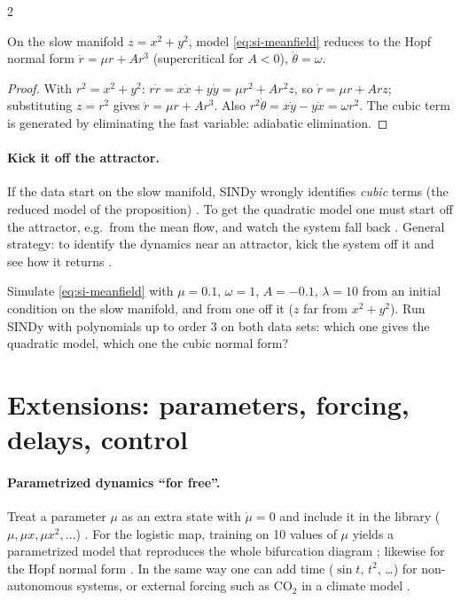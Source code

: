 \begin{paracol}{2}
\begin{proposition}
On the slow manifold $z=x^2+y^2$, model \eqref{eq:si-meanfield} reduces to the Hopf normal form
$\dot r=\mu r+Ar^3$ (supercritical for $A<0$), $\dot\theta=\omega$.
\end{proposition}
\begin{proof}
With $r^2=x^2+y^2$: $r\dot r=x\dot x+y\dot y=\mu r^2+Ar^2z$, so $\dot r=\mu r+Arz$; substituting $z=r^2$
gives $\dot r=\mu r+Ar^3$. Also $r^2\dot\theta=x\dot y-y\dot x=\omega r^2$. The cubic term is generated by
eliminating the fast variable: adiabatic elimination.
\end{proof}

\paragraph{Kick it off the attractor.} If the data start on the slow manifold, SINDy wrongly identifies
\emph{cubic} terms (the reduced model of the proposition) . To get the quadratic model one
must start off the attractor, e.g.\ from the mean flow, and watch the system fall back .
General strategy: to identify the dynamics near an attractor, kick the system off it and see how it
returns .

\begin{exercise}
Simulate \eqref{eq:si-meanfield} with $\mu=0.1$, $\omega=1$, $A=-0.1$, $\lambda=10$ from an initial
condition on the slow manifold, and from one off it ($z$ far from $x^2+y^2$). Run SINDy with polynomials up
to order 3 on both data sets: which one gives the quadratic model, which one the cubic normal form?
\end{exercise}

\section{Extensions: parameters, forcing, delays, control}\label{sec:si-extensions}

\paragraph{Parametrized dynamics ``for free''.} Treat a parameter $\mu$ as an extra state with
$\dot\mu=0$ and include it in the library ($\mu,\mu x,\mu x^2,\dots$) . For the
logistic map, training on 10 values of $\mu$ yields a parametrized model that reproduces the whole
bifurcation diagram ; likewise for the Hopf normal form . In the same
way one can add time ($\sin t$, $t^2$, \dots) for non-autonomous systems, or external forcing such as CO$_2$
in a climate model .


\end{paracol}
